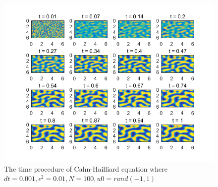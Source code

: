 \documentclass[a4paper]{article}
\begin{document}
\begin{figure}[h]
    \centering
    \includegraphics[scale=0.5]{2DCahn_Hilliard_Time[0,1].png}
    \caption{The time procedure of Cahn-Hailliard equation where $dt = 0.001, \epsilon^2=0.01, N=100, u0=rand(-1,1)$}
    \label{im::2D_Cahn_Hilliard_time}
\end{figure}
\end{document}
